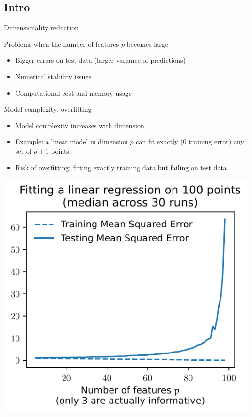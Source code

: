 \documentclass[presentation,mathserif,table]{beamer}
\begin{document}
\subsection{Intro}
\label{sec:orgb8d8b3b}
\begin{frame}[label={sec:org75092a4}]{Dimensionality reduction}
\begin{block}{Problems when the number of features \(p\) becomes large}
\begin{itemize}
\item Bigger errors on test data (larger variance of predictions)
\item Numerical stability issues
\item Computational cost and memory usage
\end{itemize}
\end{block}
\end{frame}
\begin{frame}[label={sec:orga924fa7}]{Model complexity: overfitting}
\begin{itemize}
\item Model complexity increases with dimension.
\item Example: a linear model in dimension \(p\) can fit exactly (0 training error) any set of \(p + 1\) points.
\item Risk of overfitting: fitting exactly training data but failing on test data
\end{itemize}

\begin{center}
\includegraphics[height=.7\textheight]{figures/generated/ridge_overfitting/mse.pdf}
\end{center}
\end{frame}
\end{document}
